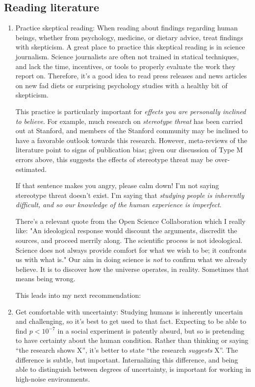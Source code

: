 \documentclass{tufte-handout}
\begin{document}
\subsection{Reading literature}
\label{sec:org97c9ed3}
\begin{enumerate}
\item Practice skeptical reading:
\label{sec:orge4c7575}
When reading about findings regarding human beings, whether from psychology,
medicine, or dietary advice, treat findings with skepticism. A great place to
practice this skeptical reading is in science journalism. Science journalists
are often not trained in statical techniques, and lack the time, incentives, or
tools to properly evaluate the work they report on. Therefore, it's a good idea
to read press releases and news articles on new fad diets or surprising
psychology studies with a healthy bit of skepticism.

This practice is particularly important for \emph{effects you are personally inclined
to believe}. For example, much research on \emph{stereotype threat} has been carried
out at Stanford, and members of the Stanford community may be inclined to have a
favorable outlook towards this research.\cite{spencer1999stereotype} However,
meta-reviews \cite{flore2015does} of the literature point to signs of publication
bias; given our discussion of Type M errors above, this suggests the effects of
stereotype threat may be over-estimated.

If that sentence makes you angry, please calm down! I'm not saying stereotype
threat doesn't exist. I'm saying that \emph{studying people is inherently difficult,
and so our knowledge of the human experience is imperfect}.

There's a relevant quote from the Open Science Collaboration which I really
like: "An ideological response would discount the arguments, discredit the
sources, and proceed merrily along. The scientific process is not ideological.
Science does not always provide comfort for what we wish to be; it confronts us
with what is."\cite{open2015estimating} Our aim in doing science is \emph{not} to
confirm what we already believe. It is to discover how the universe operates, in
reality. Sometimes that means being wrong.

This leads into my next recommendation:

\item Get comfortable with uncertainty:
\label{sec:orgdf32f54}
Studying humans is inherently uncertain and challenging, so it's best to get
used to that fact. Expecting to be able to find \(p<10^{-7}\) in a social
experiment is patently absurd, but so is pretending to have certainty about the
human condition. Rather than thinking or saying ``the research shows X'', it's
better to state ``the research \emph{suggests} X''. The difference is subtle, but
important. Internalizing this difference, and being able to distinguish between
degrees of uncertainty, is important for working in high-noise environments.


\end{enumerate}
\end{document}
